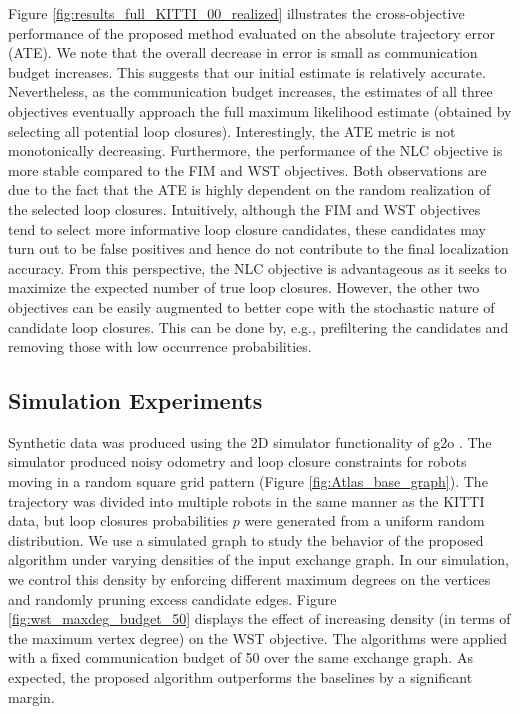 \documentclass[conference]{IEEEtran}
\begin{document}
Figure \ref{fig:results_full_KITTI_00_realized} illustrates the cross-objective
performance of the proposed method evaluated on 
the absolute trajectory error (ATE).  
We note that the overall decrease in error is small as communication budget increases. This suggests that our initial estimate is relatively accurate. Nevertheless, as the communication budget increases, the estimates of
all three objectives eventually approach the full maximum likelihood estimate (obtained by selecting all potential loop closures). 
Interestingly,
the ATE metric is not monotonically decreasing. Furthermore, the performance of the NLC
objective is more stable compared to the FIM and WST objectives. Both observations are due to the fact that 
the ATE is highly dependent 
on the random realization of the selected loop closures. 
Intuitively, although the FIM and WST objectives tend to select more informative loop closure candidates,
these candidates may turn out to be false positives and hence do not contribute to the final localization accuracy.
From this perspective, the NLC objective is advantageous as it seeks 
to maximize the expected number of true loop closures. 
However, the other two objectives can be easily augmented
to better cope with the stochastic nature of candidate loop closures.
This can be done
by, e.g., prefiltering the candidates and removing those 
with low occurrence probabilities. 


\subsection{Simulation Experiments}
Synthetic data was produced using the 2D simulator functionality of g2o \cite{kummerle2011g}. The simulator produced noisy odometry and loop closure constraints for robots moving in a random square grid pattern (Figure
\ref{fig:Atlas_base_graph}). The trajectory was divided into multiple robots in the 
same manner as the KITTI data, but loop closures probabilities $p$ were generated from a uniform random distribution. 
We use a simulated graph to study the behavior of the proposed algorithm under varying densities of the input exchange graph.
In our simulation, we control this density by enforcing different maximum degrees on the vertices and randomly pruning excess candidate edges. 
Figure \ref{fig:wst_maxdeg_budget_50} displays the effect of increasing density (in terms of the maximum vertex degree) on the WST objective. 
The algorithms were applied with a fixed communication budget of 50 over the same exchange graph. As expected, the proposed algorithm outperforms the baselines by a significant margin. 
\end{document}
